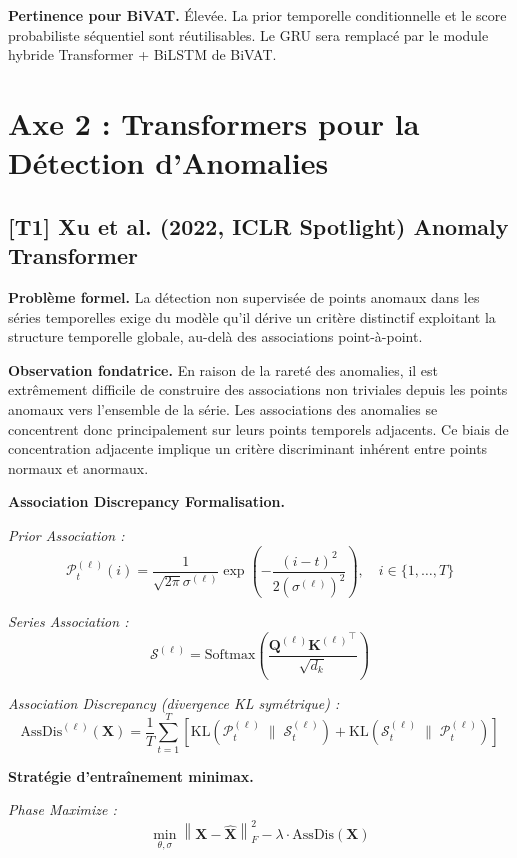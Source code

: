 \documentclass[12pt,a4paper]{article}
\begin{document}
\textbf{Pertinence pour BiVAT.} Élevée. La prior temporelle conditionnelle et
le score probabiliste séquentiel sont réutilisables. Le GRU sera remplacé par
le module hybride Transformer + BiLSTM de BiVAT.

\section{Axe 2 : Transformers pour la Détection d'Anomalies}

\subsection{[T1] Xu et al. (2022, ICLR Spotlight)  Anomaly Transformer}

\textbf{Problème formel.} La détection non supervisée de points anomaux dans
les séries temporelles exige du modèle qu'il dérive un critère distinctif
exploitant la structure temporelle globale, au-delà des associations point-à-point.

\textbf{Observation fondatrice.} En raison de la rareté des anomalies, il est
extrêmement difficile de construire des associations non triviales depuis les
points anomaux vers l'ensemble de la série. Les associations des anomalies se
concentrent donc principalement sur leurs points temporels adjacents. Ce biais
de concentration adjacente implique un critère discriminant inhérent entre
points normaux et anormaux.

\textbf{Association Discrepancy  Formalisation.}

\textit{Prior Association :}
$$\mathcal{P}^{(\ell)}_t(i) = \frac{1}{\sqrt{2\pi}\sigma^{(\ell)}}
\exp\!\left(-\frac{(i-t)^2}{2(\sigma^{(\ell)})^2}\right),
\quad i \in \{1,\ldots,T\}$$

\textit{Series Association :}
$$\mathcal{S}^{(\ell)} = \mathrm{Softmax}\!\left(
\frac{\mathbf{Q}^{(\ell)}{\mathbf{K}^{(\ell)}}^\top}{\sqrt{d_k}}\right)$$

\textit{Association Discrepancy (divergence KL symétrique) :}
$$\mathrm{AssDis}^{(\ell)}(\mathbf{X}) = \frac{1}{T}\sum_{t=1}^{T}\!\left[
\mathrm{KL}\!\left(\mathcal{P}^{(\ell)}_t \;\|\; \mathcal{S}^{(\ell)}_t\right)
+ \mathrm{KL}\!\left(\mathcal{S}^{(\ell)}_t \;\|\;
\mathcal{P}^{(\ell)}_t\right)\right]$$

\textbf{Stratégie d'entraînement minimax.}

\textit{Phase Maximize :}
$$\min_{\theta,\sigma}\left\|\mathbf{X} - \hat{\mathbf{X}}\right\|_F^2
- \lambda\cdot\mathrm{AssDis}(\mathbf{X})$$
\end{document}
